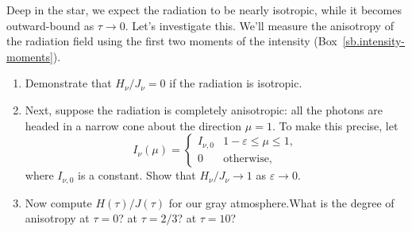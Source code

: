 \begin{exercisebox}
Deep in the star, we expect the radiation to be nearly isotropic, while it becomes outward-bound as $\tau\to 0$. Let's investigate this. We'll measure the anisotropy of the radiation field using the first two moments of the intensity (Box~\ref{sb.intensity-moments}).
\begin{enumerate}
\item
Demonstrate that $H_{\nu}/J_{\nu} = 0$ if the radiation is isotropic.

\item
Next, suppose the radiation is completely anisotropic: all the photons are headed in a narrow cone about the direction $\mu = 1$. To make this precise, let
\[
	I_{\nu}(\mu) = \left\{
		\begin{array}{lr}
			I_{\nu,0} & 1-\varepsilon \le \mu \le 1,\\
			0 & \textrm{otherwise,}
		\end{array}
	\right.
\]
where $I_{\nu,0}$ is a constant. Show that $H_{\nu}/J_{\nu} \to 1$ as $\varepsilon\to 0$.

\item
Now compute $H(\tau)/J(\tau)$ for our gray atmosphere.What is the degree of anisotropy at $\tau = 0$? at $\tau=2/3$? at $\tau = 10$?
\end{enumerate}
\end{exercisebox}



